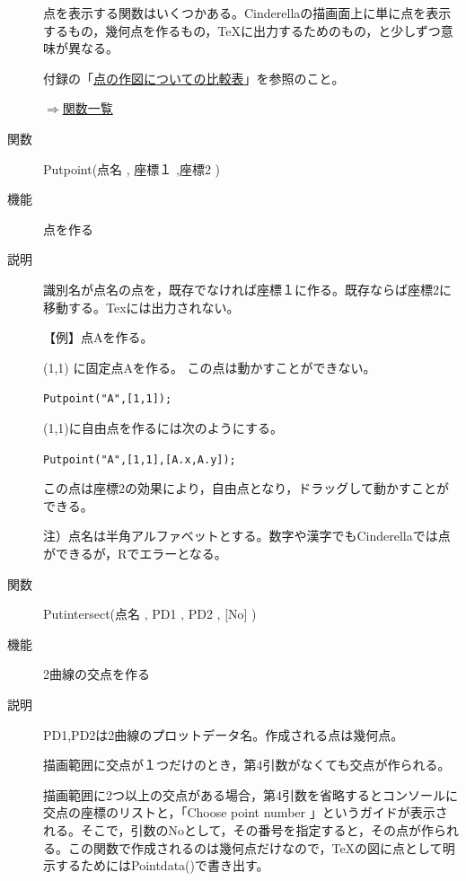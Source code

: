 \documentclass[papersize,a4paper,12pt,uplatex]{jsarticle}
\begin{document}
\begin{description}
点を表示する関数はいくつかある。Cinderellaの描画面上に単に点を表示するもの，幾何点を作るもの，TeXに出力するためのもの，と少しずつ意味が異なる。

付録の「\hyperlink{mkpttable}{点の作図についての比較表}」を参照のこと。

\begin{flushright}  \hyperlink{functionlist}{$\Rightarrow$関数一覧}\end{flushright}

\vspace{\baselineskip}
\hypertarget{putpoint}{}
\item[関数]  Putpoint(点名 , 座標１ ,座標2 )
\item[機能]  点を作る
\item[説明]  識別名が点名の点を，既存でなければ座標１に作る。既存ならば座標2に移動する。Texには出力されない。

\vspace{\baselineskip}
【例】点Aを作る。

(1,1) に固定点Aを作る。 この点は動かすことができない。

\hspace{10mm}   \verb|Putpoint("A",[1,1]);|
 
    (1,1)に自由点を作るには次のようにする。
    
\hspace{10mm}  \verb|Putpoint("A",[1,1],[A.x,A.y]);|
 
    この点は座標2の効果により，自由点となり，ドラッグして動かすことができる。

\vspace{\baselineskip}
注）点名は半角アルファベットとする。数字や漢字でもCinderellaでは点ができるが，Rでエラーとなる。

\vspace{\baselineskip}
\hypertarget{putintersect}{}
\item[関数]  Putintersect(点名 , PD1 , PD2 , [No] )
\item[機能]  2曲線の交点を作る
\item[説明]  PD1,PD2は2曲線のプロットデータ名。作成される点は幾何点。

描画範囲に交点が１つだけのとき，第4引数がなくても交点が作られる。

描画範囲に2つ以上の交点がある場合，第4引数を省略するとコンソールに交点の座標のリストと，「Choose point number 」というガイドが表示される。そこで，引数のNoとして，その番号を指定すると，その点が作られる。この関数で作成されるのは幾何点だけなので，\TeX の図に点として明示するためにはPointdata()で書き出す。


\end{description}
\end{document}
